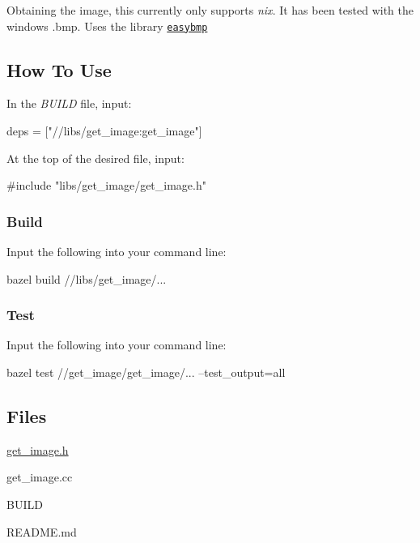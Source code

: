 Obtaining the image, this currently only supports {\itshape nix}. It has been tested with the windows .bmp. Uses the library \href{http://prdownloads.sourceforge.net/easybmp/EasyBMP_1.06.zip}{\tt easybmp}

\subsection*{How To Use}

In the {\itshape B\+U\+I\+LD} file, input\+: 
\begin{DoxyCode}
deps = ["//libs/get\_image:get\_image"]
\end{DoxyCode}
 At the top of the desired file, input\+: 
\begin{DoxyCode}
#include "libs/get\_image/get\_image.h"
\end{DoxyCode}


\subsubsection*{Build}

Input the following into your command line\+: 
\begin{DoxyCode}
bazel build //libs/get\_image/...
\end{DoxyCode}


\subsubsection*{Test}

Input the following into your command line\+: 
\begin{DoxyCode}
bazel test //get\_image/get\_image/... --test\_output=all
\end{DoxyCode}


\subsection*{Files}


\begin{DoxyItemize}
\item \hyperlink{get__image_8h_source}{get\+\_\+image.\+h} ~\newline
~\newline

\item get\+\_\+image.\+cc ~\newline
~\newline

\item B\+U\+I\+LD
\item R\+E\+A\+D\+M\+E.\+md
\end{DoxyItemize}

